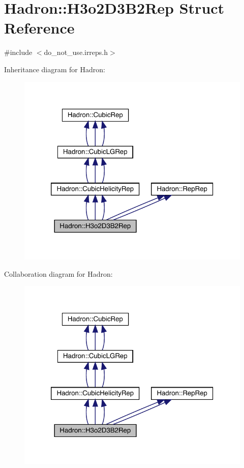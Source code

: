 \hypertarget{structHadron_1_1H3o2D3B2Rep}{}\section{Hadron\+:\+:H3o2\+D3\+B2\+Rep Struct Reference}
\label{structHadron_1_1H3o2D3B2Rep}


{\ttfamily \#include $<$do\+\_\+not\+\_\+use.\+irreps.\+h$>$}



Inheritance diagram for Hadron\+:
\nopagebreak
\begin{figure}[H]
\begin{center}
\leavevmode
\includegraphics[width=320pt]{d7/d36/structHadron_1_1H3o2D3B2Rep__inherit__graph}
\end{center}
\end{figure}


Collaboration diagram for Hadron\+:
\nopagebreak
\begin{figure}[H]
\begin{center}
\leavevmode
\includegraphics[width=320pt]{d3/d40/structHadron_1_1H3o2D3B2Rep__coll__graph}
\end{center}
\end{figure}
